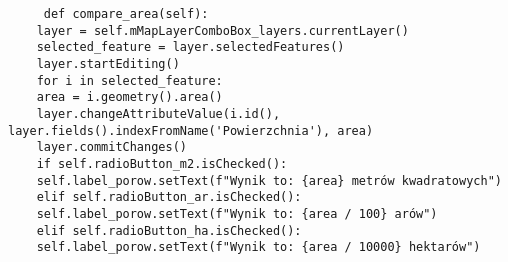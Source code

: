 \documentclass[a4paper,titleauthor]{mwart}
\begin{document}
\begin{verbatim}
	 def compare_area(self):
	layer = self.mMapLayerComboBox_layers.currentLayer()
	selected_feature = layer.selectedFeatures()
	layer.startEditing()
	for i in selected_feature:
	area = i.geometry().area()
	layer.changeAttributeValue(i.id(), layer.fields().indexFromName('Powierzchnia'), area)
	layer.commitChanges()
	if self.radioButton_m2.isChecked():
	self.label_porow.setText(f"Wynik to: {area} metrów kwadratowych")
	elif self.radioButton_ar.isChecked():
	self.label_porow.setText(f"Wynik to: {area / 100} arów")
	elif self.radioButton_ha.isChecked():
	self.label_porow.setText(f"Wynik to: {area / 10000} hektarów")
\end{verbatim}
\end{document}
